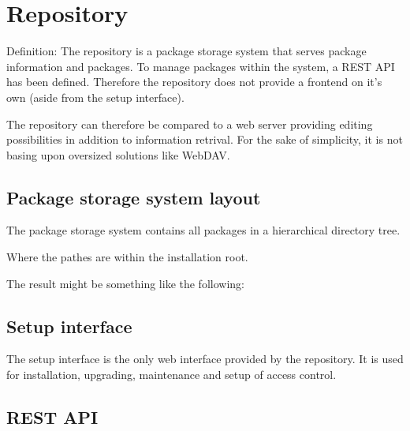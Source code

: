 \section[sec:repository]{Repository}
Definition:
The repository is a package storage system that serves package information and packages.
To manage packages within the system, a REST API has been defined. Therefore the repository does not provide a frontend on it's own (aside from the setup interface).

The repository can therefore be compared to a web server providing editing possibilities in addition to information retrival.
For the sake of simplicity, it is not basing upon oversized solutions like WebDAV.

\subsection[sec:repository package storage system]{Package storage system layout}
The package storage system contains all packages in a hierarchical directory tree.

Where the pathes are within the installation root.

The result might be something like the following:


\subsection[sec:repository setup interface]{Setup interface}

The setup interface is the only web interface provided by the repository. It is used for installation, upgrading, maintenance and setup of access control.

\subsection[sec:repository rest api]{REST API}


